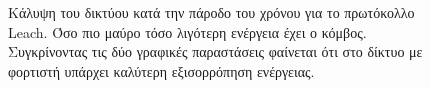 \begin{figure}[H]
  \centering
  \caption{Κάλυψη του δικτύου κατά την πάροδο του χρόνου για το πρωτόκολλο Leach. Όσο πιο μαύρο τόσο λιγότερη ενέργεια έχει ο κόμβος. Συγκρίνοντας τις δύο γραφικές
παραστάσεις φαίνεται ότι στο δίκτυο με φορτιστή υπάρχει καλύτερη εξισορρόπηση ενέργειας.}
  \label{fig:5_1exp_4_2}
\end{figure}

